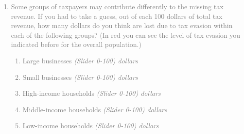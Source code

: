 \documentclass[11pt]{article}
\begin{document}
\begin{enumerate}[resume]
    \item[\sout{\theenumi.}] \textcolor{gray}{Some groups of taxpayers may contribute differently to the missing tax revenue. If you had to take a guess, out of each 100 dollars of total tax revenue, how many dollars do you think are lost due to tax evasion within each of the following groups? (In red you can see the level of tax evasion you indicated before for the overall population.)}
    \textcolor{gray}{
    \begin{enumerate}[label=\alph*)]
        \item Large businesses \textit{(Slider 0-100) dollars} 
        \item Small businesses \textit{(Slider 0-100) dollars} 
        \item High-income households \textit{(Slider 0-100) dollars} 
        \item Middle-income households \textit{(Slider 0-100) dollars} 
        \item Low-income households \textit{(Slider 0-100) dollars} 
    \end{enumerate}}
\end{enumerate}
\end{document}
